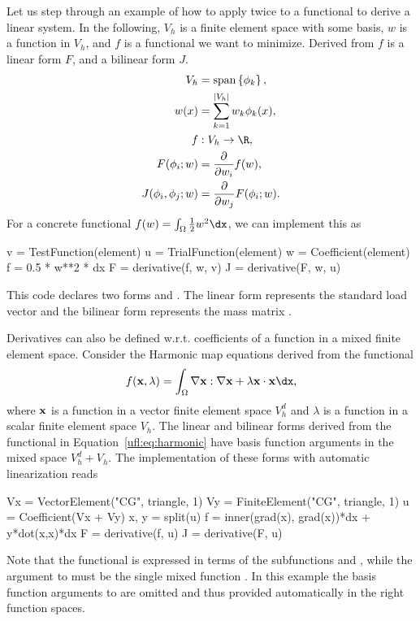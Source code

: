 Let us step through an example of how to apply 
twice to a functional to derive a linear system.  In the following,
$V_h$ is a finite element space with some basis, $w$ is a function in
$V_h$, and $f$ is a functional we want to minimize. Derived from $f$
is a linear form $F$, and a bilinear form $J$.
\begin{align}
V_h &= \spans{ \phi_k }, \\
w(x) &= \sum_{k=1}^{|V_h|} w_k \phi_k(x), \\
f&: V_h \rightarrow \R, \\
F(\phi_i; w) &= \frac{\partial}{\partial w_i} f(w), \\
J(\phi_i, \phi_j; w) &= \frac{\partial}{\partial w_j} F(\phi_i; w) .
\end{align}
For a concrete functional $f(w) = \int_\Omega \frac 1 2 w^2 \dx$, we can implement this as
\begin{python}
v = TestFunction(element)
u = TrialFunction(element)
w = Coefficient(element)
f = 0.5 * w**2 * dx
F = derivative(f, w, v)
J = derivative(F, w, u)
\end{python}
This code declares two forms  and .  The linear form
 represents the standard load vector  and the
bilinear form  represents the mass matrix .

Derivatives can also be defined w.r.t. coefficients of a function in a
mixed finite element space.  Consider the Harmonic map equations
derived from the functional
\begin{align} \label{ufl:eq:harmonic}
f(\xx, \lambda) = \int_\Omega \nabla \xx : \nabla \xx + \lambda \xx\cdot\xx \dx,
\end{align}
where $\mathbf{x}$ is a function in a vector finite element space $V_h^d$ and
$\lambda$ is a function in a scalar finite element space $V_h$.  The
linear and bilinear forms derived from the functional in
Equation~\ref{ufl:eq:harmonic} have basis function arguments in the
mixed space $V_h^d + V_h$.  The implementation of these forms with
automatic linearization reads
\begin{python}
Vx = VectorElement("CG", triangle, 1)
Vy = FiniteElement("CG", triangle, 1)
u = Coefficient(Vx + Vy)
x, y = split(u)
f = inner(grad(x), grad(x))*dx + y*dot(x,x)*dx
F = derivative(f, u)
J = derivative(F, u)
\end{python}
Note that the functional is expressed in terms of the subfunctions
 and , while the argument to  must
be the single mixed function .  In this example the basis
function arguments to  are omitted and thus provided
automatically in the right function spaces.

